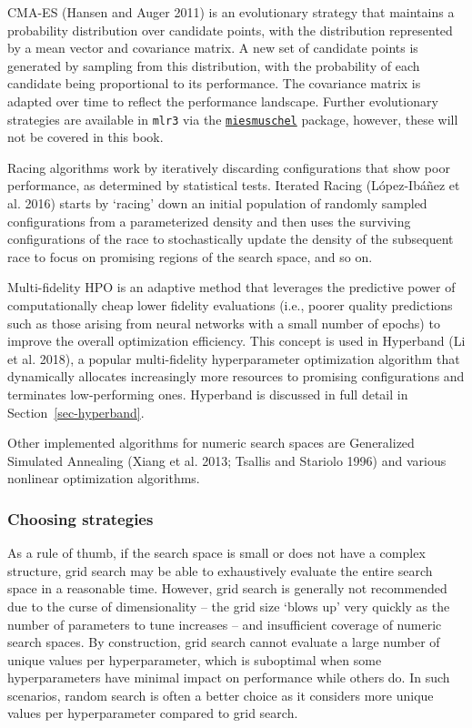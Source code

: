 CMA-ES (Hansen and Auger 2011) is an evolutionary
strategy that maintains a probability
distribution over candidate points, with the distribution represented by
a mean vector and covariance matrix. A new set of candidate points is
generated by sampling from this distribution, with the probability of
each candidate being proportional to its performance. The covariance
matrix is adapted over time to reflect the performance landscape.
Further evolutionary strategies are available in \texttt{mlr3} via the
\href{https://cran.r-project.org/package=miesmuschel}{\texttt{miesmuschel}}
package, however, these will not be covered in this book.

Racing algorithms work by iteratively discarding configurations that
show poor performance, as determined by statistical tests. Iterated Racing (López-Ibáñez et al. 2016) starts by `racing' down an initial
population of randomly sampled configurations from a parameterized
density and then uses the surviving configurations of the race to
stochastically update the density of the subsequent race to focus on
promising regions of the search space, and so on.

Multi-fidelity HPO is an adaptive method that leverages the predictive
power of computationally cheap lower fidelity evaluations (i.e., poorer
quality predictions such as those arising from neural networks with a
small number of epochs) to improve the overall optimization efficiency.
This concept is used in Hyperband (Li et al. 2018), a
popular multi-fidelity hyperparameter optimization algorithm that
dynamically allocates increasingly more resources to promising
configurations and terminates low-performing ones. Hyperband is
discussed in full detail in Section~\ref{sec-hyperband}.

Other implemented algorithms for numeric search spaces are Generalized
Simulated Annealing (Xiang et al. 2013; Tsallis and Stariolo 1996) and
various nonlinear optimization algorithms.

\hypertarget{choosing-strategies}{%
\subsubsection*{Choosing strategies}\label{choosing-strategies}}

As a rule of thumb, if the search space is small or does not have a
complex structure, grid search may be able to exhaustively evaluate the
entire search space in a reasonable time. However, grid
search is generally not recommended due to the curse
of dimensionality -- the grid size `blows up' very quickly as the number
of parameters to tune increases -- and insufficient coverage of numeric
search spaces. By construction, grid search cannot evaluate a large
number of unique values per hyperparameter, which is suboptimal when
some hyperparameters have minimal impact on performance while others do.
In such scenarios, random search is often a better
choice as it considers more unique values per hyperparameter compared to
grid search.

